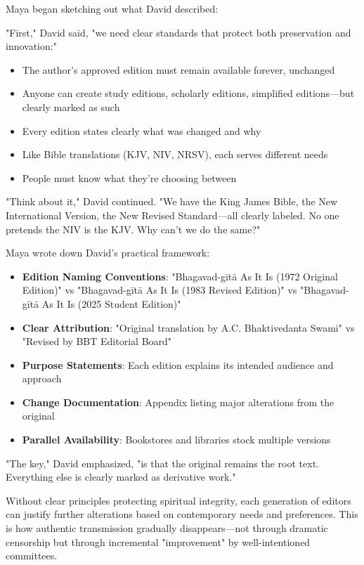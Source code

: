 \documentclass[12pt,twoside]{book}
\begin{document}
Maya began sketching out what David described:

"First," David said, "we need clear standards that protect both preservation and innovation:"

\begin{itemize}
\item The author's approved edition must remain available forever, unchanged
\item Anyone can create study editions, scholarly editions, simplified editions—but clearly marked as such
\item Every edition states clearly what was changed and why
\item Like Bible translations (KJV, NIV, NRSV), each serves different needs
\item People must know what they're choosing between
\end{itemize}

"Think about it," David continued. "We have the King James Bible, the New International Version, the New Revised Standard—all clearly labeled. No one pretends the NIV is the KJV. Why can't we do the same?"

Maya wrote down David's practical framework:

\begin{itemize}
\item \textbf{\textbf{Edition Naming Conventions}}: "Bhagavad-gītā As It Is (1972 Original Edition)" vs "Bhagavad-gītā As It Is (1983 Revised Edition)" vs "Bhagavad-gītā As It Is (2025 Student Edition)"
\item \textbf{\textbf{Clear Attribution}}: "Original translation by A.C. Bhaktivedanta Swami" vs "Revised by BBT Editorial Board"
\item \textbf{\textbf{Purpose Statements}}: Each edition explains its intended audience and approach
\item \textbf{\textbf{Change Documentation}}: Appendix listing major alterations from the original
\item \textbf{\textbf{Parallel Availability}}: Bookstores and libraries stock multiple versions
\end{itemize}

"The key," David emphasized, "is that the original remains the root text. Everything else is clearly marked as derivative work."

Without clear principles protecting spiritual integrity, each generation of editors can justify further alterations based on contemporary needs and preferences. This is how authentic transmission gradually disappears—not through dramatic censorship but through incremental "improvement" by well-intentioned committees.
\end{document}
